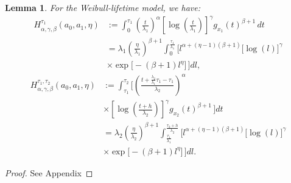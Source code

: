 \documentclass{article}
\newtheorem{lemma}[theorem]{Lemma}
\begin{document}
\begin{lemma}
	For the Weibull-lifetime model, we have:
\begin{equation}
\begin{aligned}
H_{\alpha,\gamma,\beta}^{\tau_1}(a_0,a_1,\eta)
&:=\int_{0}^{\tau_1}
\left(\frac{t}{\lambda_1}\right)^{\alpha}
\left[
\log\!\left(\frac{t}{\lambda_1}\right)
\right]^{\gamma}
g_{x_1}(t)^{\beta+1}\,dt
\\
&=\lambda_1
\left(\frac{\eta}{\lambda_1}\right)^{\beta+1}
\int_{0}^{\frac{\tau_1}{\lambda_1}}
\Big[l^{\alpha+(\eta-1)(\beta+1)}
\big[\log(l)\big]^{\gamma}
\\
&\times
\exp\!\Big[
-(\beta+1)l^{\eta}
\Big]\,\Big]dl ,
\end{aligned}  \nonumber
\end{equation}
\begin{equation}
\begin{aligned}
H_{\alpha,\gamma,\beta}^{\tau_1,\tau_2}(a_0,a_1,\eta)
&:=\int_{\tau_1}^{\tau_2}\Big[
\left(
\frac{t+\frac{\lambda_2}{\lambda_1}\tau_1-\tau_1}{\lambda_2}
\right)^{\alpha}
\\
&\times
\left[
\log\!\left(
\frac{t+h}{\lambda_2}
\right)
\right]^{\gamma}
g_{x_2}(t)^{\beta+1}\,\Big]dt
\\
&=\lambda_2
\left(\frac{\eta}{\lambda_2}\right)^{\beta+1}
\int_{\frac{\tau_1}{\lambda_1}}^{\frac{\tau_2+h}{\lambda_2}}
\Big[l^{\alpha+(\eta-1)(\beta+1)}
\big[\log(l)\big]^{\gamma}
\\
&\times
\exp\!\Big[
-(\beta+1)l^{\eta}
\Big]\,\Big]dl .
\end{aligned}  \nonumber
\end{equation}

\end{lemma}
\begin{proof}
See Appendix
\end{proof}
\end{document}

